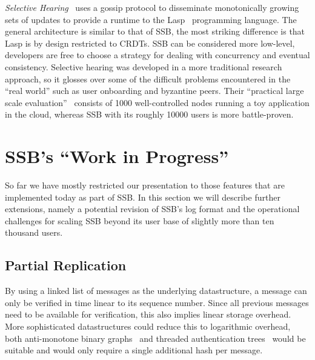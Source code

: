 \documentclass[9pt,sigconf]{acmart}
\begin{document}
\textit{Selective Hearing}~\cite{meiklejohn2015selective} uses a gossip protocol to disseminate monotonically growing sets of updates to provide a runtime to the Lasp~\cite{meiklejohn2015lasp} programming language. The general architecture is similar to that of SSB, the most striking difference is that Lasp is by design restricted to CRDTs. SSB can be considered more low-level, developers are free to choose a strategy for dealing with concurrency and eventual consistency. Selective hearing was developed in a more traditional research approach, so it glosses over some of the difficult problems encountered in the ``real world'' such as user onboarding and byzantine peers. Their ``practical large scale evaluation''~\cite{meiklejohn2017lasp} consists of 1000 well-controlled nodes running a toy application in the cloud, whereas SSB with its roughly 10000 users is more battle-proven.



\section{SSB's ``Work in Progress''}
\label{sec:wip}

So far we have mostly restricted our presentation to those features that are implemented today as part of SSB. In this section we will describe further extensions, namely a potential revision of SSB's log format and the operational challenges for scaling SSB beyond its user base of slightly more than ten thousand users.


\subsection{Partial Replication}

By using a linked list of messages as the underlying datastructure, a message can only be verified in time linear to its sequence number. Since all previous messages need to be available for verification, this also implies linear storage overhead. More sophisticated datastructures could reduce this to logarithmic overhead, both anti-monotone binary graphs~\cite{buldas1998new} and threaded authentication trees~\cite{buldas2000optimally} would be suitable and would only require a single additional hash per message.
\end{document}
